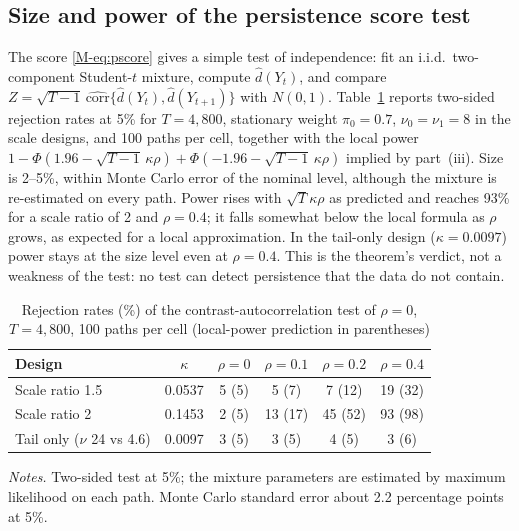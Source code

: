 \documentclass[11pt,a4paper]{article}
\theoremstyle{plain}
\theoremstyle{remark}
\begin{document}
\subsection{Size and power of the persistence score test}\label{sec:scoretest}
The score \eqref{M-eq:pscore} gives a simple test of independence: fit an i.i.d.\ two-component Student-$t$ mixture, compute $\hat d(Y_t)$, and compare $Z=\sqrt{T-1}\,\widehat{\mathrm{corr}}\{\hat d(Y_t),\hat d(Y_{t+1})\}$ with $N(0,1)$. Table~\ref{tab:scoretest} reports two-sided rejection rates at 5\% for $T=4{,}800$, stationary weight $\pi_0=0.7$, $\nu_0=\nu_1=8$ in the scale designs, and 100 paths per cell, together with the local power $1-\Phi(1.96-\sqrt{T-1}\,\kappa\rho)+\Phi(-1.96-\sqrt{T-1}\,\kappa\rho)$ implied by part~(iii). Size is 2--5\%, within Monte Carlo error of the nominal level, although the mixture is re-estimated on every path. Power rises with $\sqrt T\kappa\rho$ as predicted and reaches 93\% for a scale ratio of 2 and $\rho=0.4$; it falls somewhat below the local formula as $\rho$ grows, as expected for a local approximation. In the tail-only design ($\kappa=0.0097$) power stays at the size level even at $\rho=0.4$. This is the theorem's verdict, not a weakness of the test: no test can detect persistence that the data do not contain.

\begin{table}[ht]
\centering\small
\caption{Rejection rates (\%) of the contrast-autocorrelation test of $\rho=0$, $T=4{,}800$, 100 paths per cell (local-power prediction in parentheses)}\label{tab:scoretest}
\begin{tabular}{lccccc}
\toprule
Design & $\kappa$ & $\rho=0$ & $\rho=0.1$ & $\rho=0.2$ & $\rho=0.4$\\
\midrule
Scale ratio 1.5 & 0.0537 & 5 (5) & 5 (7) & 7 (12) & 19 (32)\\
Scale ratio 2 & 0.1453 & 2 (5) & 13 (17) & 45 (52) & 93 (98)\\
Tail only ($\nu$ 24 vs 4.6) & 0.0097 & 3 (5) & 3 (5) & 4 (5) & 3 (6)\\
\bottomrule
\end{tabular}
\par\smallskip\footnotesize\emph{Notes.} Two-sided test at 5\%; the mixture parameters are estimated by maximum likelihood on each path. Monte Carlo standard error about 2.2 percentage points at 5\%.
\end{table}
\end{document}
